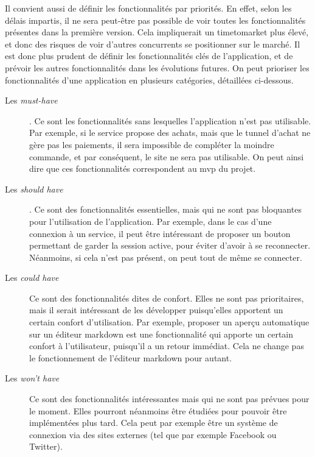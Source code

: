 
Il convient aussi de définir les fonctionnalités par priorités. En effet, selon les délais impartis, il ne sera peut-être pas possible de voir toutes les fonctionnalités présentes dans la première version. Cela impliquerait un \gls{timetomarket} plus élevé, et donc des risques de voir d'autres concurrents se positionner sur le marché. Il est donc plus prudent de définir les fonctionnalités clés de l'application, et de prévoir les autres fonctionnalités dans les évolutions futures. On peut prioriser les fonctionnalités d'une application en plusieurs catégories, détaillées ci-dessous.

\begin{description}
	\item [Les \emph{must-have}]. Ce sont les fonctionnalités sans lesquelles l'application n'est pas utilisable. Par exemple, si le service propose des achats, mais que le tunnel d'achat ne gère pas les paiements, il sera impossible de compléter la moindre commande, et par conséquent, le site ne sera pas utilisable. On peut ainsi dire que ces fonctionnalités correspondent au \gls{mvp} du projet.
	\item [Les \emph{should have}]. Ce sont des fonctionnalités essentielles, mais qui ne sont pas bloquantes pour l'utilisation de l'application. Par exemple, dans le cas d'une connexion à un service, il peut être intéressant de proposer un bouton permettant de garder la session active, pour éviter d'avoir à se reconnecter. Néanmoins, si cela n'est pas présent, on peut tout de même se connecter.
	\item [Les \emph{could have}] Ce sont des fonctionnalités dites de confort. Elles ne sont pas prioritaires, mais il serait intéressant de les développer puisqu'elles apportent un certain confort d'utilisation. Par exemple, proposer un aperçu automatique sur un éditeur \gls{markdown} est une fonctionnalité qui apporte un certain confort à l'utilisateur, puisqu'il a un retour immédiat. Cela ne change pas le fonctionnement de l'éditeur \gls{markdown} pour autant.
	\item [Les \emph{won't have}] Ce sont des fonctionnalités intéressantes mais qui ne sont pas prévues pour le moment. Elles pourront néanmoins être étudiées pour pouvoir être implémentées plus tard. Cela peut par exemple être un système de connexion via des sites externes (tel que par exemple Facebook ou Twitter).
\end{description}

